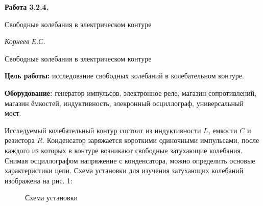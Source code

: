 \documentclass[14pt]{article}
\begin{document}
\begin{titlepage}
	\begin{center}
		\fontsize{18pt}{20pt}\selectfont
		\textbf{Работа 3.2.4.}	
	
		\vspace{5cm}
		\fontsize{24pt}{25pt}\selectfont
		Свободные колебания в электрическом контуре
	\end{center}
	\begin{flushright}
		\fontsize{18pt}{20pt}\selectfont
		\vspace{14cm}
		\hspace{-3cm}
		\textit{Корнеев Е.С.}
	\end{flushright}		
\end{titlepage}

\begin{center}
	\fontsize{16pt}{18pt}\selectfont	
	Свободные колебания в электрическом контуре
\end{center}


\fontsize{14pt}{16pt}\selectfont
\vspace{1cm}
\textbf{Цель работы:} исследование свободных колебаний в колебательном контуре.

\vspace{0.5cm}
\textbf{Оборудование:} генератор импульсов, электронное реле, магазин сопротивлений, магазин ёмкостей, индуктивность, элекронный осциллограф, универсальный мост. 

\vspace{1cm}
Исследуемый колебательный контур состоит из индуктивности $L$, емкости $C$ и резистора $R$. Конденсатор заряжается короткими одиночными импульсами, после каждого из которых в контуре возникают свободные затухающие колебания. Снимая осциллографом напряжение с конденсатора, можно определить основые характеристики цепи. Схема установки для изучения затухающих колебаний изображена на рис. 1:

\begin{figure}[h!]
	\caption{Схема установки}
	\label{fig:image}
\end{figure}
\end{document}

